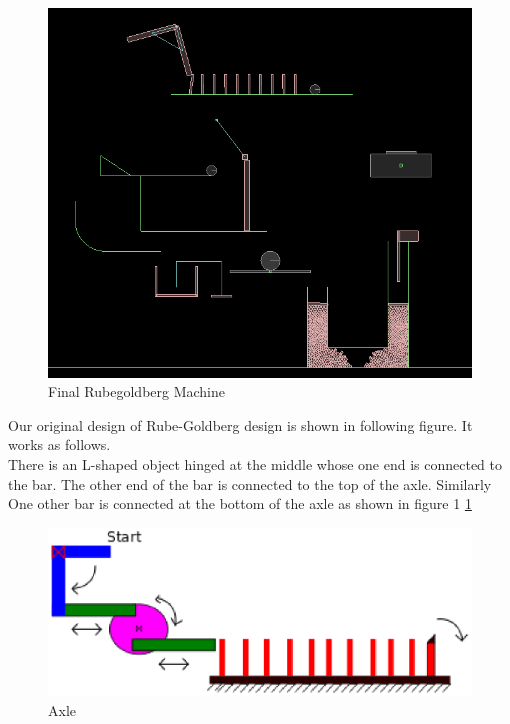 \documentclass[a4paper,11pt]{article}
\begin{document}
{\newpage
\begin{figure}[h]
    \centering
    \includegraphics[scale=0.6]{images/final_rg}
    \caption{Final Rubegoldberg Machine}
\end{figure}
\newpage

\indent \indent Our original design of Rube-Goldberg design is shown in following figure. It works as follows. \\
\indent There is an L-shaped object hinged at the middle whose one end is connected to the bar. The other end of the bar is connected to the top of the axle. Similarly One other bar is connected at the bottom of the axle as shown in figure 1 \ref{fig:trigger}\\

\begin{figure}[h]
    \centering
    \label{fig:trigger}
    \includegraphics[scale=0.6]{images/trigger}
    \caption{Axle}
\end{figure}

}
\end{document}
